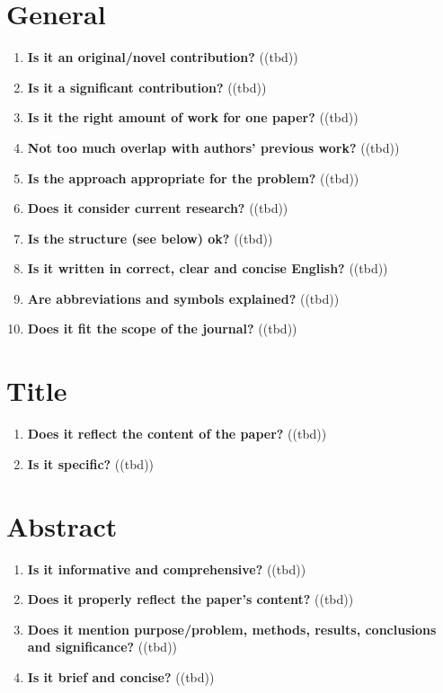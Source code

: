 \section{General}\label{sec:general}
\begin{enumerate}[resume]
    \item \textbf{Is it an original/novel contribution?} \textcolor{HighlightColor}{((tbd))}
    \item \textbf{Is it a significant contribution?} 	\textcolor{HighlightColor}{((tbd))}
    \item \textbf{Is it the right amount of work for one paper?} 	\textcolor{HighlightColor}{((tbd))}
    \item \textbf{Not too much overlap with authors’ previous work?} 	\textcolor{HighlightColor}{((tbd))}
    \item \textbf{Is the approach appropriate for the problem?} 	\textcolor{HighlightColor}{((tbd))}
    \item \textbf{Does it consider current research?} 	\textcolor{HighlightColor}{((tbd))}
    \item \textbf{Is the structure (see below) ok?} 	\textcolor{HighlightColor}{((tbd))}
    \item \textbf{Is it written in correct, clear and concise English?} 	\textcolor{HighlightColor}{((tbd))}
    \item \textbf{Are abbreviations and symbols explained?} 	\textcolor{HighlightColor}{((tbd))}
    \item \textbf{Does it fit the scope of the journal?} 	\textcolor{HighlightColor}{((tbd))}
\end{enumerate}

\section{Title}\label{sec:title}
\begin{enumerate}[resume]
    \item \textbf{Does it reflect the content of the paper?} 	\textcolor{HighlightColor}{((tbd))}
    \item \textbf{Is it specific?} 	\textcolor{HighlightColor}{((tbd))}
\end{enumerate}

\section{Abstract}\label{sec:abstract}
\begin{enumerate}[resume]
    \item \textbf{Is it informative and comprehensive?} 	\textcolor{HighlightColor}{((tbd))}
    \item \textbf{Does it properly reflect the paper’s content?} 	\textcolor{HighlightColor}{((tbd))}
    \item \textbf{Does it mention purpose/problem, methods, results, conclusions and significance?} 	\textcolor{HighlightColor}{((tbd))}
    \item \textbf{Is it brief and concise?} 	\textcolor{HighlightColor}{((tbd))}
\end{enumerate}

